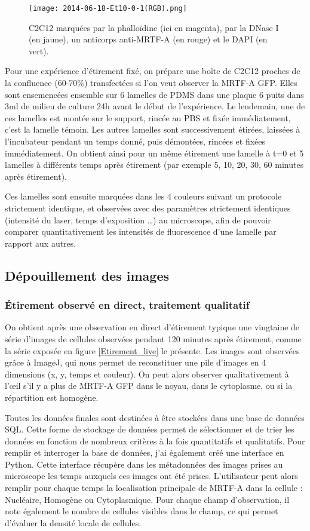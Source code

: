 	\begin{figure}
	\texttt{[image: 2014-06-18-Et10-0-1(RGB).png]}
	\caption{C2C12 marquées par la phalloïdine (ici en magenta), par la DNase I (en jaune), un anticorps anti-MRTF-A (en rouge) et le DAPI (en vert).}
	\end{figure}
	
	Pour une expérience d'étirement fixé, on prépare une boîte de C2C12 proches de la confluence (60-70\%) transfectées si l'on veut observer la MRTF-A GFP. Elles sont ensemencées ensemble sur 6 lamelles de PDMS dans une plaque 6 puits dans 3ml de milieu de culture 24h avant le début de l'expérience. Le lendemain, une de ces lamelles est montée sur le support, rincée au PBS et fixée immédiatement, c'est la lamelle témoin. Les autres lamelles sont successivement étirées, laissées à l'incubateur pendant un temps donné, puis démontées, rincées et fixées immédiatement. On obtient ainsi pour un même étirement une lamelle à t=0 et 5 lamelles à différents temps après étirement (par exemple 5, 10, 20, 30, 60 minutes après étirement). 
	
	Ces lamelles sont ensuite marquées dans les 4 couleurs suivant un protocole strictement identique, et observées avec des paramètres strictement identiques (intensité du laser, temps d'exposition \dots) au microscope, afin de pouvoir comparer quantitativement les intensités de fluorescence d'une lamelle par rapport aux autres. 
	

	\subsection{Dépouillement des images}
	\subsubsection{\'Etirement observé en direct, traitement qualitatif}
	On obtient après une observation en direct d'étirement typique une vingtaine de série d'images de cellules observées pendant 120 minutes après étirement, comme la série exposée en figure \ref{Etirement_live} le présente.
	Les images sont observées grâce à ImageJ, qui nous permet de reconstituer une pile d'images en 4 dimensions (x, y, temps et couleur). On peut alors observer qualitativement à l'\oe il s'il y a plus de MRTF-A GFP dans le noyau, dans le cytoplasme, ou si la répartition est homogène. 
	
	Toutes les données finales sont destinées à être stockées dans une base de données SQL. Cette forme de stockage de données permet de sélectionner et de trier les données en fonction de nombreux critères à la fois quantitatifs et qualitatifs. Pour remplir et interroger la base de données, j'ai également créé une interface en Python. Cette interface récupère dans les métadonnées des images prises au microscope les temps auxquels ces images ont été prises. L'utilisateur peut alors remplir pour chaque temps la localisation principale de MRTF-A dans la cellule : Nucléaire, Homogène ou Cytoplasmique. 
	Pour chaque champ d'observation, il note également le nombre de cellules visibles dans le champ, ce qui permet d'évaluer la densité locale de cellules. 
	

